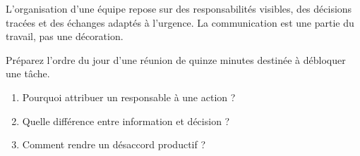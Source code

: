 \documentclass[12pt,twoside]{upbcours}
\begin{document}
\begin{resumechapitre}
  L'organisation d'une équipe repose sur des responsabilités visibles, des décisions tracées et
  des échanges adaptés à l'urgence. La communication est une partie du travail, pas une décoration.
\end{resumechapitre}
\begin{evalformative}
  Préparez l'ordre du jour d'une réunion de quinze minutes destinée à débloquer une tâche.
\end{evalformative}
\begin{autoevaluation}
  \begin{enumerate}
    \item Pourquoi attribuer un responsable à une action ?
    \item Quelle différence entre information et décision ?
    \item Comment rendre un désaccord productif ?
  \end{enumerate}
\end{autoevaluation}
\end{document}
